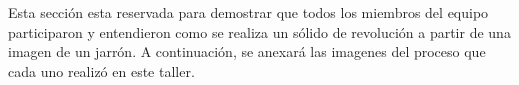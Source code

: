 
\tab Esta sección esta reservada para demostrar que todos los miembros del equipo participaron y entendieron como se realiza un sólido de revolución a partir de una imagen de un jarrón. A continuación, se anexará las imagenes del proceso que cada uno realizó en este taller.

